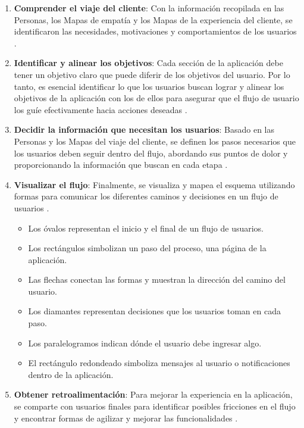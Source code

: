\begin{enumerate}
    \item \textbf{Comprender el viaje del cliente}: Con la información recopilada en las Personas, los Mapas de empatía y los Mapas de la experiencia del cliente, se identificaron las necesidades, motivaciones y comportamientos de los usuarios \cite{Adobe2022}.
    
    \item \textbf{Identificar y alinear los objetivos}: Cada sección de la aplicación debe tener un objetivo claro que puede diferir de los objetivos del usuario. Por lo tanto, es esencial identificar lo que los usuarios buscan lograr y alinear los objetivos de la aplicación con los de ellos para asegurar que el flujo de usuario los guíe efectivamente hacia acciones deseadas \cite{Adobe2022}.
    
    \item \textbf{Decidir la información que necesitan los usuarios}: Basado en las Personas y los Mapas del viaje del cliente, se definen los pasos necesarios que los usuarios deben seguir dentro del flujo, abordando sus puntos de dolor y proporcionando la información que buscan en cada etapa \cite{Adobe2022}.
    
    \item \textbf{Visualizar el flujo}: Finalmente, se visualiza y mapea el esquema utilizando formas para comunicar los diferentes caminos y decisiones en un flujo de usuarios \cite{Adobe2022}.
    \begin{itemize}
        \item Los óvalos representan el inicio y el final de un flujo de usuarios.
        \item Los rectángulos simbolizan un paso del proceso, una página de la aplicación.
        \item Las flechas conectan las formas y muestran la dirección del camino del usuario.
        \item Los diamantes representan decisiones que los usuarios toman en cada paso.
        \item Los paralelogramos indican dónde el usuario debe ingresar algo.
        \item El rectángulo redondeado simboliza mensajes al usuario o notificaciones dentro de la aplicación.
    \end{itemize}
    
    \item \textbf{Obtener retroalimentación}: Para mejorar la experiencia en la aplicación, se comparte con usuarios finales para identificar posibles fricciones en el flujo y encontrar formas de agilizar y mejorar las funcionalidades \cite{Adobe2022}.
\end{enumerate}

